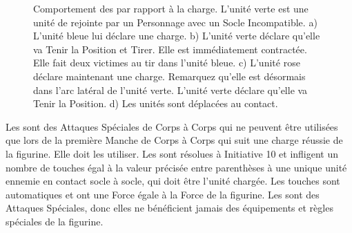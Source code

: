 \newcommand{\figSkirmiA}{a)}
\newcommand{\figSkirmiB}{b)}
\newcommand{\figSkirmiC}{c)}
\newcommand{\figSkirmiD}{d)}
\newcommand{\figSkirmiDist}{\smallfontsize 0,5\distance{}}
\newcommand{\figSkirmiCharge}{\textit{Charge !}}
\newcommand{\figSkirmiStandAndShoot}{\textit{Tenez la Position et Tirez !}}
\newcommand{\figSkirmiHold}{\textit{Tenez la Position !}}

\begin{figure}[!htbp]
\centering
\hypertarget{skirmishersfigure}{
\def\svgwidth{\textwidth}
}
\caption{Comportement des \skirmishers{} par rapport à la charge.\vspace*{10pt}\newline
L'unité verte est une unité de \skirmishers{} rejointe par un Personnage avec un Socle Incompatible.\vspace*{10pt}\newline
a) L'unité bleue lui déclare une charge.\newline
b) L'unité verte déclare qu'elle va Tenir la Position et Tirer. Elle est immédiatement contractée. Elle fait deux victimes au tir dans l'unité bleue.\newline
c) L'unité rose déclare maintenant une charge. Remarquez qu'elle est désormais dans l'arc latéral de l'unité verte. L'unité verte déclare qu'elle va Tenir la Position.\newline
d) Les unités sont déplacées au contact.}
\label{figure/skirmishers}
\end{figure}

\newpage
{}

Les \impacthits{} sont des Attaques Spéciales de Corps à Corps qui ne peuvent être utilisées que lors de la première Manche de Corps à Corps qui suit une charge réussie de la figurine. Elle doit les utiliser. Les \impacthits{} sont résolues à Initiative 10 et infligent un nombre de touches égal à la valeur précisée entre parenthèses à une unique unité ennemie en contact socle à socle, qui doit être l'unité chargée. Les touches sont automatiques et ont une Force égale à la Force de la figurine.  Les \impacthits{} sont des Attaques Spéciales, donc elles ne bénéficient jamais des équipements et règles spéciales de la figurine. 

